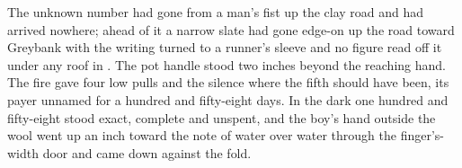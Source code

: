 The unknown number had gone from a man's fist up the clay road and had arrived nowhere; ahead of it a narrow slate had gone edge-on up the road toward Greybank with the writing turned to a runner's sleeve and no figure read off it under any roof in . The pot handle stood two inches beyond the reaching hand. The fire gave four low pulls and the silence where the fifth should have been, its payer unnamed for a hundred and fifty-eight days. In the dark one hundred and fifty-eight stood exact, complete and unspent, and the boy's hand outside the wool went up an inch toward the note of water over water through the finger's-width door and came down against the fold.
